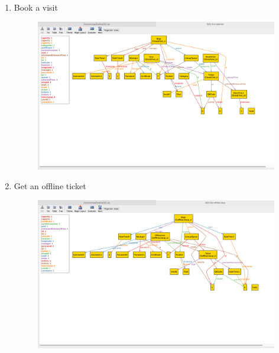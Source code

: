 \begin{enumerate}
	\item Book a visit \\
	\begin{figure}[H]
		\centering
		\includegraphics[width=0.9\textheight,keepaspectratio, angle=90]{images/alloy_BookVisit.png}
	\end{figure}
	\clearpage

	\item Get an offline ticket \\
	\begin{figure}[H]
		\centering
		\includegraphics[width=0.9\textheight,keepaspectratio, angle=90]{images/alloy_OfflineLineup.png}
	\end{figure}
	\clearpage


\end{enumerate}
